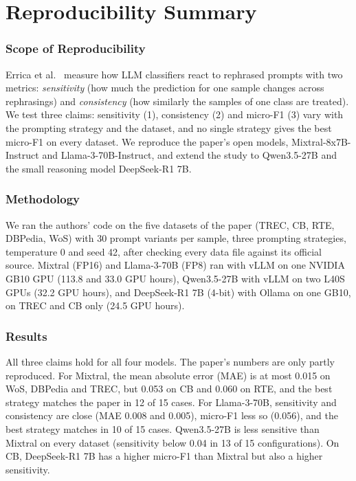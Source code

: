 \section*{\centering Reproducibility Summary}

\subsubsection*{Scope of Reproducibility}

Errica et al.~\cite{Errica:2025} measure how LLM classifiers react to
rephrased prompts with two metrics: \emph{sensitivity} (how much the
prediction for one sample changes across rephrasings) and \emph{consistency}
(how similarly the samples of one class are treated). We test three claims:
sensitivity (1), consistency (2) and micro-F1 (3) vary with the prompting
strategy and the dataset, and no single strategy gives the best micro-F1 on
every dataset. We reproduce the paper's open models, Mixtral-8x7B-Instruct
and Llama-3-70B-Instruct, and extend the study to Qwen3.5-27B and the small
reasoning model DeepSeek-R1 7B.

\subsubsection*{Methodology}

We ran the authors' code on the five datasets of the paper (TREC, CB, RTE,
DBPedia, WoS) with 30 prompt variants per sample, three prompting strategies,
temperature 0 and seed 42, after checking every data file against its official
source. Mixtral (FP16) and Llama-3-70B (FP8) ran with vLLM on one NVIDIA GB10
GPU (113.8 and 33.0 GPU hours), Qwen3.5-27B with vLLM on two L40S GPUs (32.2
GPU hours), and DeepSeek-R1 7B (4-bit) with Ollama on one GB10, on TREC and CB
only (24.5 GPU hours).

\subsubsection*{Results}

All three claims hold for all four models. The paper's numbers are only partly
reproduced. For Mixtral, the mean absolute error (MAE) is at most 0.015 on
WoS, DBPedia and TREC, but 0.053 on CB and 0.060 on RTE, and the best strategy
matches the paper in 12 of 15 cases. For Llama-3-70B, sensitivity and
consistency are close (MAE 0.008 and 0.005), micro-F1 less so (0.056), and the
best strategy matches in 10 of 15 cases. Qwen3.5-27B is less sensitive than
Mixtral on every dataset (sensitivity below 0.04 in 13 of 15 configurations).
On CB, DeepSeek-R1 7B has a higher micro-F1 than Mixtral but also a higher
sensitivity.

